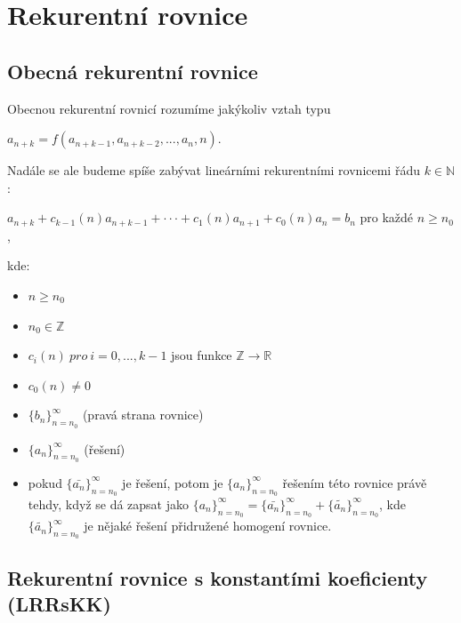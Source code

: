 \documentclass{szzclass}
\author{Daniel Hampl}
\begin{document}

\tableofcontents
\newpage

\section{Rekurentní rovnice}

\subsection{Obecná rekurentní rovnice}

Obecnou rekurentní rovnicí rozumíme jakýkoliv vztah typu

\begin{center}
    $a_{n+k}=f(a_{n+k-1},a_{n+k-2},...,a_n,n).$
\end{center}

Nadále se ale budeme spíše zabývat lineárními rekurentními rovnicemi řádu $k \in \mathbb{N}$:

\begin{center}
    $a_{n+k} + c_{k-1}(n) a_{n+k-1} + · · · + c_1(n) a_{n+1} + c_0(n) a_n = b_n$ pro každé $n \geq n_0$,
\end{center}

kde:
\begin{itemize}
    \item $n \geq n_0$
    \item $n_0 \in \mathbb{Z}$
    \item $c_i(n)\ pro\ i = 0, . . . , k-1$ jsou funkce $\mathbb{Z} \rightarrow \mathbb{R}$
    \item $c_0(n) \neq 0$
    \item $\{b_n\}^\infty_{n = n_0}$ (pravá strana rovnice)
    \item $\{a_n\}^\infty_{n=n_0}$ (řešení)
    \item pokud $\{\bar{a_n}\}^\infty_{n=n_0}$ je řešení, potom je $\{a_n\}^\infty_{n=n_0}$
    řešením této rovnice právě tehdy, když se dá zapsat jako
    $\{a_n\}^\infty_{n=n_0} = \{\bar{a_n}\}^\infty_{n=n_0} + \{\tilde{a_n}\}^\infty_{n=n_0}$,
    kde $\{\tilde{a_n}\}^\infty_{n=n_0}$ je nějaké řešení přidružené homogení rovnice.
\end{itemize}

\subsection{Rekurentní rovnice s konstantími koeficienty (LRRsKK)}
\end{document}
